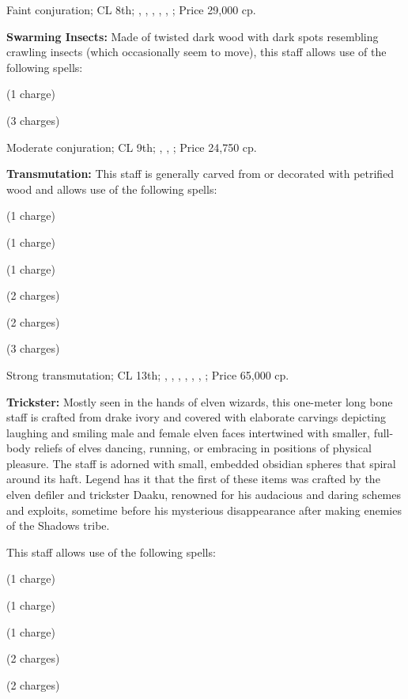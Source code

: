 Faint conjuration; CL 8th; , , , , , ; Price 29,000 cp.

\textbf{Swarming Insects:} Made of twisted dark wood with dark spots resembling crawling insects (which occasionally seem to move), this staff allows use of the following spells:
\begin{itemize*}
\item {} (1 charge)
\item {} (3 charges)
\end{itemize*}

Moderate conjuration; CL 9th; , , ; Price 24,750 cp.

\textbf{Transmutation:} This staff is generally carved from or decorated with petrified wood and allows use of the following spells:
\begin{itemize*}
\item {} (1 charge)
\item {} (1 charge)
\item {} (1 charge)
\item {} (2 charges)
\item {} (2 charges)
\item {} (3 charges)
\end{itemize*}

Strong transmutation; CL 13th; , , , , , , ; Price 65,000 cp.

\textbf{Trickster:} Mostly seen in the hands of elven wizards, this one-meter long bone staff is crafted from drake ivory and covered with elaborate carvings depicting laughing and smiling male and female elven faces intertwined with smaller, full-body reliefs of elves dancing, running, or embracing in positions of physical pleasure. The staff is adorned with small, embedded obsidian spheres that spiral around its haft. Legend has it that the first of these items was crafted by the elven defiler and trickster Daaku, renowned for his audacious and daring schemes and exploits, sometime before his mysterious disappearance after making enemies of the Shadows tribe.

This staff allows use of the following spells:
\begin{itemize*}
\item {} (1 charge)
\item {} (1 charge)
\item {} (1 charge)
\item {} (2 charges)
\item {} (2 charges)
\end{itemize*}

